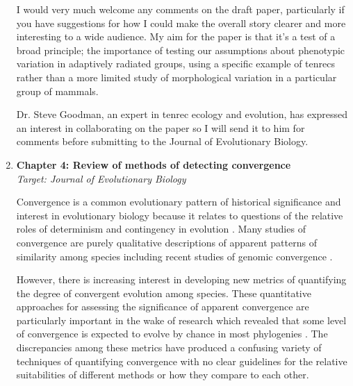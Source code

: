 \documentclass[12pt,a4paper]{article}
\begin{document}
\begin{enumerate}
I would very much welcome any comments on the draft paper, particularly if you have suggestions for how I could make the overall story clearer and more interesting to a wide audience. My aim for the paper is that it's a test of a broad principle; the importance of testing our assumptions about phenotypic variation in adaptively radiated groups, using a specific example of tenrecs rather than a more limited study of morphological variation in a particular group of mammals.

Dr. Steve Goodman, an expert in tenrec ecology and evolution, has expressed an interest in collaborating on the paper so I will send it to him for comments before submitting to the Journal of Evolutionary Biology.

\item \textbf{Chapter 4: Review of methods of detecting convergence}\\
\textit{Target: Journal of Evolutionary Biology}

Convergence is a common evolutionary pattern of historical significance and interest in evolutionary biology because it relates to questions of the relative roles of determinism and contingency in evolution \citep[c.f][]{Blount2008}. Many studies of convergence are purely qualitative descriptions of apparent patterns of similarity among species \citep[e.g.][]{Ben-Moshe2001, Leal2002, Fleischer2008} including recent studies of genomic convergence \citep{Jones2012, Parker2013}. 

However, there is increasing interest in developing new metrics of quantifying the degree of convergent evolution among species. These quantitative approaches for assessing the significance of apparent convergence are particularly important in the wake of research which revealed that some level of convergence is expected to evolve by chance in most phylogenies \citep{Stayton2008}.
The discrepancies among these metrics have produced a confusing variety of techniques of quantifying convergence with no clear guidelines for the relative suitabilities of different methods or how they compare to each other.
   


\end{enumerate}
\end{document}
